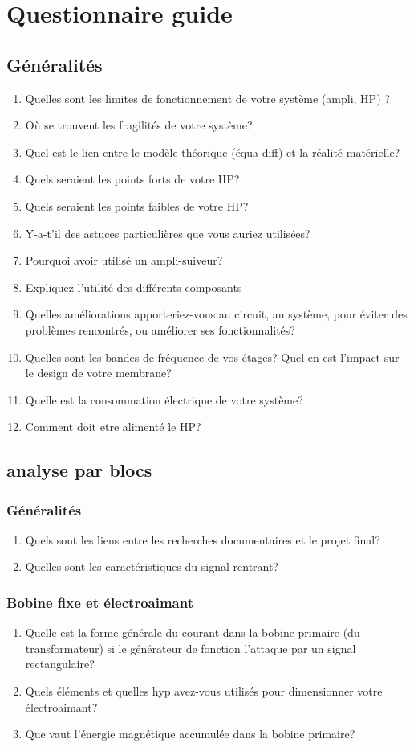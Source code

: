 
\section{Questionnaire guide}
\subsection{Généralités}
\begin{enumerate}
\item Quelles sont les limites de fonctionnement de votre système (ampli, HP) ?
\item Où se trouvent les fragilités de votre système?
\item Quel est le lien entre le modèle théorique (équa diff) et la réalité matérielle?
\item Quels seraient les points forts de votre HP?
\item Quels seraient les points faibles de votre HP?
\item Y-a-t'il des astuces particulières que vous auriez utilisées?
\item Pourquoi avoir utilisé un ampli-suiveur?
\item Expliquez l'utilité des différents composants
\item Quelles améliorations apporteriez-vous au circuit, au système, pour éviter des problèmes rencontrés, ou améliorer ses fonctionnalités?
\item Quelles sont les bandes de fréquence de vos étages? Quel en est l'impact sur le design de votre membrane?
\item Quelle est la consommation électrique de votre système?
\item Comment doit etre alimenté le HP?
\end{enumerate}
\subsection{analyse par blocs}
\subsubsection{Généralités}
\begin{enumerate}
\item Quels sont les liens entre les recherches documentaires et le projet final?
\item Quelles sont les caractéristiques du signal rentrant?
\end{enumerate}
\subsubsection{Bobine fixe et électroaimant}
\begin{enumerate}
\item Quelle est la forme générale du courant dans la bobine primaire (du transformateur) si le générateur de fonction l'attaque par un signal rectangulaire?
\item Quels éléments et quelles hyp avez-vous utilisés pour dimensionner votre électroaimant?
\item Que vaut l'énergie magnétique accumulée dans la bobine primaire?
\end{enumerate}
